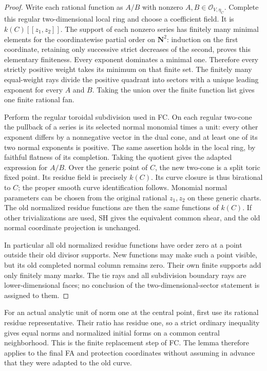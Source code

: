 \begin{proof}
Write each rational function as $A/B$ with nonzero
$A,B\in\mathcal O_{V,\eta_C}$.  Complete this regular
two-dimensional local ring and choose a coefficient field.
It is $k(C)[[z_1,z_2]]$.  The support of each nonzero
series has finitely many minimal elements for the coordinatewise
partial order on $\mathbf N^2$: induction on the first
coordinate, retaining only successive strict decreases of the
second, proves this elementary finiteness.  Every exponent
dominates a minimal one.  Therefore every strictly positive
weight takes its minimum on that finite set.  The finitely
many equal-weight rays divide the positive quadrant into
sectors with a unique leading exponent for every $A$ and $B$.
Taking the union over the finite function list gives one finite
rational fan.

Perform the regular toroidal subdivision used in FC.  On each
regular two-cone the pullback of a series is its selected
normal monomial times a unit: every other exponent differs
by a nonnegative vector in the dual cone, and at least one
of its two normal exponents is positive.  The same assertion
holds in the local ring, by faithful flatness of its completion.
Taking the quotient gives the adapted expression for $A/B$.
Over the generic point of $C$, the new two-cone is a split
toric fixed point.  Its residue field is precisely $k(C)$.
Its curve closure is thus birational to $C$; the proper smooth
curve identification follows.  Monomial normal parameters
can be chosen from the original rational $z_1,z_2$ on these
generic charts.  The old normalized residue functions are
then the same functions of $k(C)$.  If other trivializations
are used, SH gives the equivalent common shear, and the old
normal coordinate projection is unchanged.

In particular all old normalized residue functions have order
zero at a point outside their old divisor supports.  New
functions may make such a point visible, but its old completed
normal column remains zero.  Their own finite supports add
only finitely many marks.  The tie rays and all subdivision
boundary rays are lower-dimensional faces; no conclusion of
the two-dimensional-sector statement is assigned to them.
\end{proof}

For an actual analytic unit of norm one at the central point,
first use its rational residue representative.  Their ratio
has residue one, so a strict ordinary inequality gives equal
norms and normalized initial forms on a common central
neighborhood.  This is the finite replacement step of FC.
The lemma therefore applies to the final FA and protection
coordinates without assuming in advance that they were adapted
to the old curve.


